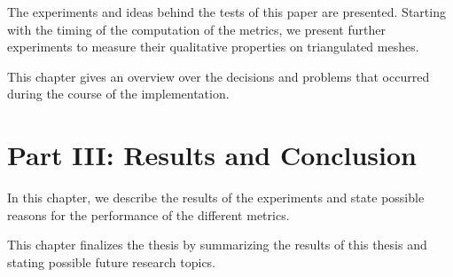   \vspace{1mm}

\noindent  The experiments and ideas behind the tests of this paper are presented.
Starting with the timing of the computation of the metrics, we present further experiments to measure their qualitative properties on triangulated meshes.\\

  \vspace{1mm}

\noindent  This chapter gives an overview over the decisions and problems that occurred during the course of the implementation. \\

\section*{Part III: Results and Conclusion}

  \vspace{1mm}

\noindent  In this chapter, we describe the results of the experiments and state possible reasons for the performance of the different metrics. \\

  \vspace{1mm}

\noindent This chapter finalizes the thesis by summarizing the results of this thesis and stating possible future research topics.
